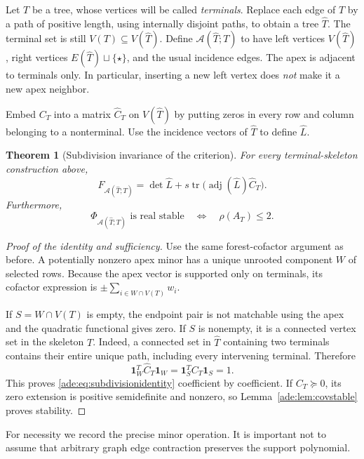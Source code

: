\documentclass[11pt]{article}
\numberwithin{equation}{section}
\newtheorem{theorem}{Theorem}[section]
\theoremstyle{definition}
\newcommand{\one}{\mathbf 1}
\newcommand{\adj}{\operatorname{adj}}
\newcommand{\tr}{\operatorname{tr}}
\newcommand{\calA}{\mathcal A}
\begin{document}
Let $T$ be a tree, whose vertices will be called \emph{terminals}.
Replace each edge of $T$ by a path of positive length, using internally
disjoint paths, to obtain a tree $\widehat T$.  The terminal set is still
$V(T)\subseteq V(\widehat T)$.  Define $\calA(\widehat T;T)$ to have left
vertices $V(\widehat T)$, right vertices $E(\widehat T)\sqcup\{\star\}$,
and the usual incidence edges.  The apex is adjacent to terminals only.
In particular, inserting a new left vertex does \emph{not} make it a new
apex neighbor.

Embed $C_T$ into a matrix $\widehat C_T$ on $V(\widehat T)$ by putting
zeros in every row and column belonging to a nonterminal.  Use the
incidence vectors of $\widehat T$ to define $\widehat L$.

\begin{theorem}[Subdivision invariance of the criterion]
\label{ade:thm:subdivision}
For every terminal-skeleton construction above,
\begin{equation}
 F_{\calA(\widehat T;T)}
 =\det\widehat L+s\tr\bigl(\adj(\widehat L)\widehat C_T\bigr).
 \label{ade:eq:subdivisionidentity}
\end{equation}
Furthermore,
\begin{equation}
 \Phi_{\calA(\widehat T;T)}\text{ is real stable}
 \quad\Longleftrightarrow\quad \rho(A_T)\le2.
 \label{ade:eq:subdivisioncriterion}
\end{equation}
\end{theorem}
\begin{proof}[Proof of the identity and sufficiency]
Use the same forest-cofactor argument as before.  A potentially nonzero
apex minor has a unique unrooted component $W$ of selected rows.  Because
the apex vector is supported only on terminals, its cofactor expression
is $\pm\sum_{i\in W\cap V(T)}w_i$.

If $S=W\cap V(T)$ is empty, the endpoint pair is not matchable using the
apex and the quadratic functional gives zero.  If $S$ is nonempty, it is
a connected vertex set in the skeleton $T$.  Indeed, a connected set in
$\widehat T$ containing two terminals contains their entire unique path,
including every intervening terminal.  Therefore
\[
 \one_W^T\widehat C_T\one_W
 =\one_S^TC_T\one_S=1.
\]
This proves \eqref{ade:eq:subdivisionidentity} coefficient by coefficient.
If $C_T\succeq0$, its zero extension is positive semidefinite and nonzero,
so Lemma~\ref{ade:lem:covstable} proves stability.
\end{proof}

For necessity we record the precise minor operation.  It is important not
to assume that arbitrary graph edge contraction preserves the support
polynomial.
\end{document}
